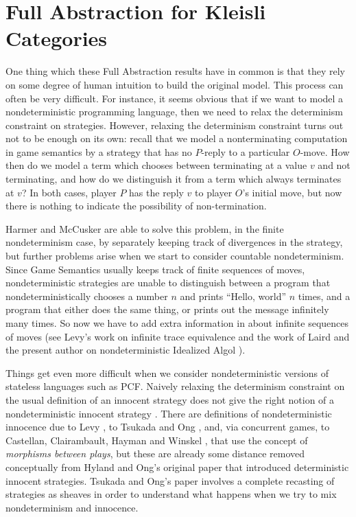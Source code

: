 \section{Full Abstraction for Kleisli Categories}

One thing which these Full Abstraction results have in common is that they rely on some degree of human intuition to build the original model.  
This process can often be very difficult.  
For instance, it seems obvious that if we want to model a nondeterministic programming language, then we need to relax the determinism constraint on strategies.  
However, relaxing the determinism constraint turns out not to be enough on its own: recall that we model a nonterminating computation in game semantics by a strategy that has no $P$-reply to a particular $O$-move.  
How then do we model a term which chooses between terminating at a value $v$ and not terminating, and how do we distinguish it from a term which always terminates at $v$?  
In both cases, player $P$ has the reply $v$ to player $O$'s initial move, but now there is nothing to indicate the possibility of non-termination.  

Harmer and McCusker are able to solve this problem, in the finite nondeterminism case, by separately keeping track of divergences in the strategy, but further problems arise when we start to consider countable nondeterminism.  
Since Game Semantics usually keeps track of finite sequences of moves, nondeterministic strategies are unable to distinguish between a program that nondeterministically chooses a number $n$ and prints ``Hello, world'' $n$ times, and a program that either does the same thing, or prints out the message infinitely many times.
So now we have to add extra information in about infinite sequences of moves (see Levy's work on infinite trace equivalence \cite{LevyGsInfinite} and the work of Laird and the present author on nondeterministic Idealized Algol \cite{CslPaper}).

Things get even more difficult when we consider nondeterministic versions of stateless languages such as PCF.  
Naively relaxing the determinism constraint on the usual definition of an innocent strategy does not give the right notion of a nondeterministic innocent strategy \cite{TsukadaSheaves}.  
There are definitions of nondeterministic innocence due to Levy \cite{levy2014morphisms}, to Tsukada and Ong \cite{TsukadaSheaves}, and, via concurrent games, to Castellan, Clairambault, Hayman and Winskel \cite{NonAngelic}, that use the concept of \emph{morphisms between plays}, but these are already some distance removed conceptually from Hyland and Ong's original paper that introduced deterministic innocent strategies.
Tsukada and Ong's paper involves a complete recasting of strategies as sheaves in order to understand what happens when we try to mix nondeterminism and innocence.

